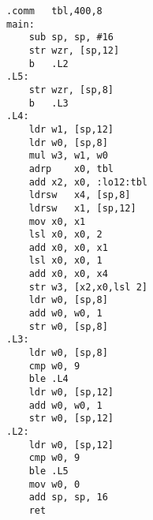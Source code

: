 \begin{lstlisting}[caption=\NonOptimizing GCC 4.9 (ARM64)]
	.comm	tbl,400,8
main:
	sub	sp, sp, #16
	str	wzr, [sp,12]
	b	.L2
.L5:
	str	wzr, [sp,8]
	b	.L3
.L4:
	ldr	w1, [sp,12]
	ldr	w0, [sp,8]
	mul	w3, w1, w0
	adrp	x0, tbl
	add	x2, x0, :lo12:tbl
	ldrsw	x4, [sp,8]
	ldrsw	x1, [sp,12]
	mov	x0, x1
	lsl	x0, x0, 2
	add	x0, x0, x1
	lsl	x0, x0, 1
	add	x0, x0, x4
	str	w3, [x2,x0,lsl 2]
	ldr	w0, [sp,8]
	add	w0, w0, 1
	str	w0, [sp,8]
.L3:
	ldr	w0, [sp,8]
	cmp	w0, 9
	ble	.L4
	ldr	w0, [sp,12]
	add	w0, w0, 1
	str	w0, [sp,12]
.L2:
	ldr	w0, [sp,12]
	cmp	w0, 9
	ble	.L5
	mov	w0, 0
	add	sp, sp, 16
	ret
\end{lstlisting}



\Answer\: 
